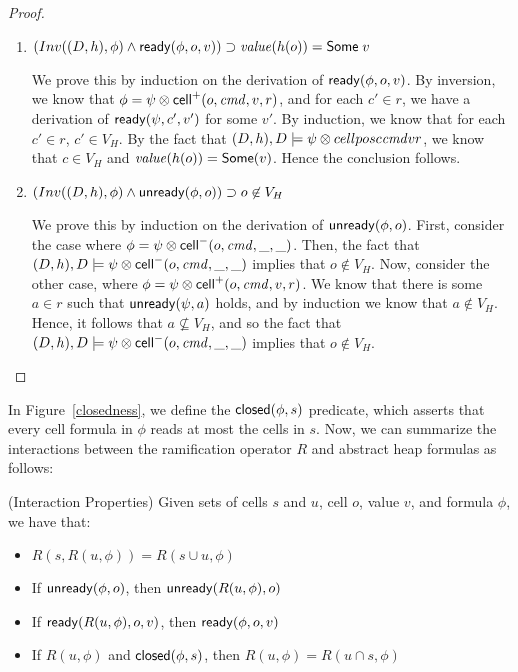 \begin{proof}
\begin{enumerate}
\item $(Inv((D,h), \phi) \land \mathsf{ready}({\phi}, {o}, {v})) \supset \mathit{value}(h(o)) = \mathsf{Some}\;v$

We prove this by induction on the derivation of
$\mathsf{ready}({\phi}, {o}, {v})$. By inversion, we know that $\phi = \psi \otimes
\mathsf{cell}^{+}({o}, {\mathit{cmd}}, {v}, {r})$, and for each $c' \in r$, we have a derivation
of $\mathsf{ready}({\psi}, {c'}, {v'})$ for some $v'$. By induction, we know that
for each $c' \in r$, $c' \in V_H$. By the fact that $(D,h), D \models
\psi \otimes cellpos{c}{\mathit{cmd}}{v}{r}$, we know that $c \in V_H$ and
$\mathit{value}(h(o)) = \mathsf{Some}(v)$. Hence the conclusion follows. 

\item $(Inv((D,h), \phi) \land \mathsf{unready}({\phi}, {o})) \supset o \not\in V_H$

We prove this by induction on the derivation of $\mathsf{unready}({\phi}, {o})$.
First, consider the case where $\phi = \psi \otimes \mathsf{cell}^{-}({o}, {\mathit{cmd}}, {\_}, {\_})$. 
Then, the fact that $(D,h), D \models \psi \otimes \mathsf{cell}^{-}({o}, {\mathit{cmd}}, {\_}, {\_})$
implies that $o \not\in V_H$. Now, consider the other case, where 
$\phi = \psi \otimes \mathsf{cell}^{+}({o}, {\mathit{cmd}}, {v}, {r})$. We know that there is
some $a \in r$ such that $\mathsf{unready}({\psi}, {a})$ holds, and by induction
we know that $a \not\in V_H$. Hence, it follows that $a \not\subseteq V_H$,
and so the fact that $(D,h), D \models \psi \otimes \mathsf{cell}^{-}({o}, {\mathit{cmd}}, {\_}, {\_})$ implies
that $o \not\in V_H$. 
\end{enumerate}
\end{proof}


In Figure~\ref{closedness}, we define the $\mathsf{closed}({\phi}, {s})$ predicate,
which asserts that every cell formula in $\phi$ reads at most the
cells in $s$. Now, we can summarize the interactions between the 
ramification operator $R$ and abstract heap formulas as follows: 

\begin{prop}{(Interaction Properties)}
Given sets of cells $s$ and $u$, cell $o$, value $v$, and formula $\phi$, we have
that:
\begin{itemize}
\item $R(s, R(u, \phi)) = R(s \cup u, \phi)$
\item If $\mathsf{unready}({\phi}, {o})$, then $\mathsf{unready}({R(u, \phi)}, {o})$ 
\item If $\mathsf{ready}({R(u, \phi)}, {o}, {v})$, then $\mathsf{ready}({\phi}, {o}, {v})$ 
\item If $R(u, \phi)$ and $\mathsf{closed}({\phi}, {s})$, then $R(u, \phi) = R(u \cap s, \phi)$ 
\end{itemize}
\end{prop}

